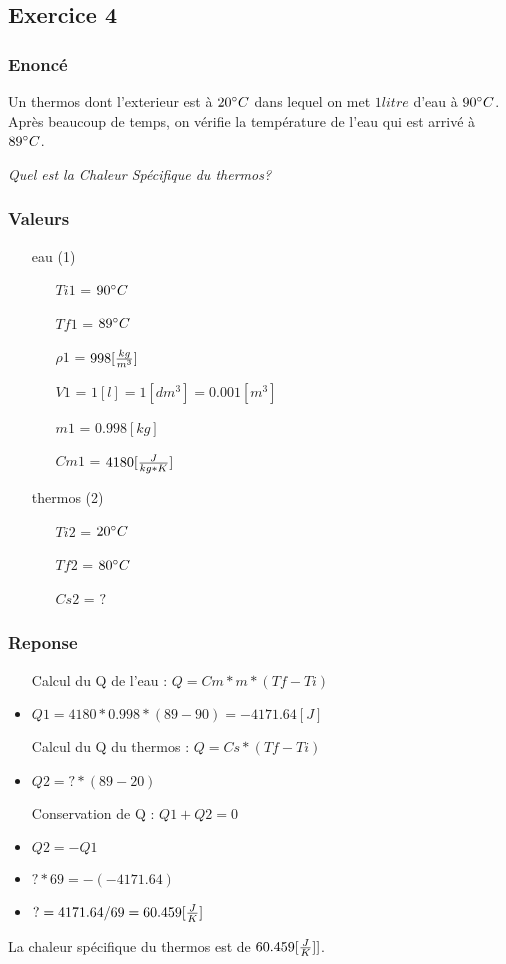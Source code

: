 \subsection{Exercice 4}
\subsubsection{Enoncé}
Un thermos dont l'exterieur est à $20\celsius$ dans lequel on met $1litre$ d'eau à $90\celsius$. Après beaucoup de temps, on vérifie la température de l'eau qui est arrivé à $89\celsius$.

\textit{Quel est la Chaleur Spécifique du thermos?}
\subsubsection{Valeurs}
\begin{itemize}
    \item[eau] (1)
    \item[] 
    \begin{itemize}
        \item[$Ti1$] = $90\celsius$
         \item[$Tf1$] = $89\celsius$
        \item[${\rho}1$] = $998[\kgmv]$
        \item[$V1$] = $1[l]=1[dm^3] = 0.001[m^3]$
        \item[$m1$] = $0.998[kg]$
        \item[$Cm1$] = $4180[\cm]$
    \end{itemize} 
    \item[thermos] (2)
    \item[] 
    \begin{itemize}
        \item[$Ti2$] = $20\celsius$
         \item[$Tf2$] = $80\celsius$
        \item[$Cs2$] = $?$   
    \end{itemize} 
\end{itemize}
\subsubsection{Reponse}
\begin{itemize}
    \item[Calcul du Q de l'eau] :  $Q = Cm * m * (Tf- Ti)$
    \item $Q1 = 4180 * 0.998 * (89-90) = -4171.64[J]$
    \item[Calcul du Q du thermos] :  $Q = Cs * (Tf-Ti)$
    \item $Q2 = ? * (89-20)$
    \item[Conservation de Q] : $Q1 + Q2 = 0$
    \item $Q2 = -Q1$
    \item $? * 69 = -(-4171.64)$
    \item $? = 4171.64 / 69 = 60.459[\cs]$
\end{itemize}
La chaleur spécifique du thermos est de $60.459[\cs]]$.
